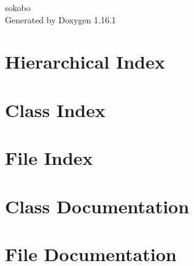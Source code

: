 \documentclass[twoside]{book}
\newcommand{\+}{\discretionary{\mbox{\scriptsize$\hookleftarrow$}}{}{}}
\newcommand{\clearemptydoublepage}{%
    \newpage{\pagestyle{empty}\cleardoublepage}%
  }
\begin{document}
  \raggedbottom
    \hypersetup{pageanchor=false,
                bookmarksnumbered=true,
                pdfencoding=unicode
               }
  \begin{titlepage}
  \vspace*{7cm}
  \begin{center}%
  {\Large sokobo}\\
  \vspace*{1cm}
  {\large Generated by Doxygen 1.16.1}\\
  \end{center}
  \end{titlepage}
  \clearemptydoublepage
  \tableofcontents
  \clearemptydoublepage
  \hypersetup{pageanchor=true}

\chapter{Hierarchical Index}

\chapter{Class Index}

\chapter{File Index}

\chapter{Class Documentation}
















\chapter{File Documentation}























  \backmatter
  \newpage
  \clearemptydoublepage
  \printindex
\end{document}
